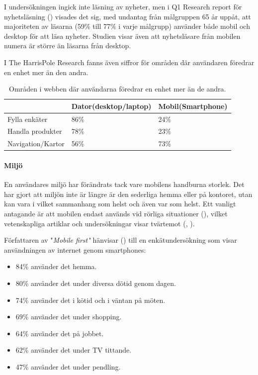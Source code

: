 \documentclass[11pt]{article}
\begin{document}
I undersökningen ingick inte läsning av nyheter, men i Q1 Research report för nyhetsläsning (\cite{q1research}) visades det sig, med undantag från målgruppen 65 år uppåt, att majoriteten av läsarna (59\% till 77\% i varje målgrupp) använder både mobil och desktop för att läsa nyheter. Studien visar även att nyhetsläsare från mobilen numera är större än läsarna från desktop.

I The HarrisPole Research fanns även siffror för områden där användaren föredrar en enhet mer än den andra.

\begin{table}[H]
	\centering
	\begin{tabular}{|p{4cm}|p{4cm}|p{4cm}|}
	\hline
	~&Dator(desktop/laptop)&Mobil(Smartphone)\\ \hline
	Fylla enkäter &86\%&24\%\\ \hline
	Handla produkter&78\%&23\%\\ \hline
	Navigation/Kartor&56\%&73\%\\ \hline
	\end{tabular}
    \caption {Områden i webben där användarna föredrar en enhet mer än de andra.}
\end{table}

\paragraph{Miljö} \mbox{}

En användares miljö har förändrats tack vare mobilens handburna storlek. Det har gjort att miljön inte är längre är den sederliga hemma eller på kontoret, utan kan vara i vilket sammanhang som helst och även var som helst. Ett vanligt antagande är att mobilen endast används vid rörliga situationer (\cite[s.12]{mobilefirstluke}), vilket vetenskapliga artiklar och undersökningar visar tvärtemot (\cite{mobilewebsearch}, \cite{mobilefirstluke}).

Författaren av "\textit{Mobile first"} hänvisar (\cite[s.12]{mobilefirstluke}) till en enkätundersökning som visar användningen av internet genom smartphones:
\begin{itemize}
	\item{84\% använder det hemma.}
	\item{80\% använder det under diversa dötid genom dagen.}
	\item{74\% använder det i kötid och i väntan på möten.}
	\item{69\% använder det under shopping.}
	\item{64\% använder det på jobbet.}
	\item{62\% använder det under TV tittande.}
	\item{47\% använder det under pendling.}
\end{itemize}
\bigskip
\end{document}

